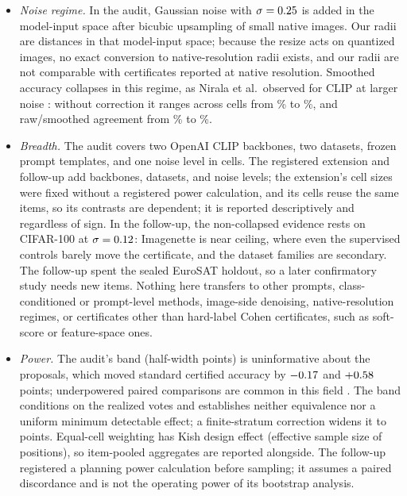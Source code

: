 \begin{itemize}
\item \textit{Noise regime.} In the audit, Gaussian noise with $\sigma=0.25$ is added in the model-input space after bicubic upsampling of small native images. Our radii are distances in that model-input space; because the resize acts on quantized images, no exact conversion to native-resolution radii exists, and our radii are not comparable with certificates reported at native resolution. Smoothed accuracy collapses in this regime, as Nirala et al.\ observed for CLIP at larger noise \cite{nirala2024ovc}: without correction it ranges across cells from \RangeSmoothedLo\% to \RangeSmoothedHi\%, and raw/smoothed agreement from \RangeAgreementLo\% to \RangeAgreementHi\%.
\item \textit{Breadth.} The audit covers two OpenAI CLIP backbones, two datasets, frozen prompt templates, and one noise level in \ExpCells{} cells. The registered extension and follow-up add backbones, datasets, and noise levels; the extension's cell sizes were fixed without a registered power calculation, and its cells reuse the same \ExtUniqueItems{} items, so its contrasts are dependent; it is reported descriptively and regardless of sign. In the follow-up, the non-collapsed evidence rests on CIFAR-100 at $\sigma=0.12$: Imagenette is near ceiling, where even the supervised controls barely move the certificate, and the dataset families are secondary. The follow-up spent the sealed EuroSAT holdout, so a later confirmatory study needs new items. Nothing here transfers to other prompts, class-conditioned or prompt-level methods, image-side denoising, native-resolution regimes, or certificates other than hard-label Cohen certificates, such as soft-score or feature-space ones.
\item \textit{Power.} The audit's band (half-width \BandHalfWidth{} points) is uninformative about the proposals, which moved standard certified accuracy by $-0.17$ and $+0.58$ points; underpowered paired comparisons are common in this field \cite{card2020power}. The band conditions on the realized votes and establishes neither equivalence nor a uniform minimum detectable effect; a finite-stratum correction widens it to \BandHalfWidthSens{} points. Equal-cell weighting has Kish design effect \KishDesignEffect{} (effective sample size \EffectiveN{} of \ExpPositions{} positions), so item-pooled aggregates are reported alongside. The follow-up registered a planning power calculation before sampling; it assumes a paired discordance and is not the operating power of its bootstrap analysis.

\end{itemize}
